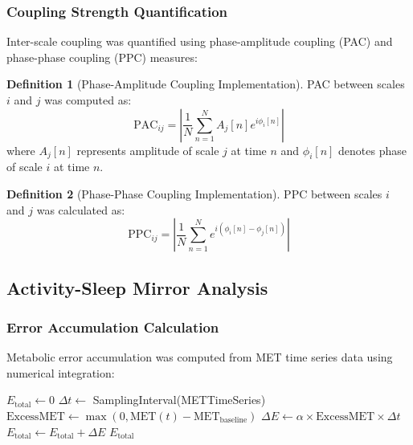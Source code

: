 \documentclass[12pt,a4paper]{article}
\theoremstyle{definition}
\newtheorem{definition}{Definition}[section]
\begin{document}
\subsubsection{Coupling Strength Quantification}

Inter-scale coupling was quantified using phase-amplitude coupling (PAC) and phase-phase coupling (PPC) measures:

\begin{definition}[Phase-Amplitude Coupling Implementation]
PAC between scales $i$ and $j$ was computed as:
\begin{equation}
\text{PAC}_{ij} = \left| \frac{1}{N} \sum_{n=1}^{N} A_j[n] e^{i\phi_i[n]} \right|
\end{equation}
where $A_j[n]$ represents amplitude of scale $j$ at time $n$ and $\phi_i[n]$ denotes phase of scale $i$ at time $n$.
\end{definition}

\begin{definition}[Phase-Phase Coupling Implementation]
PPC between scales $i$ and $j$ was calculated as:
\begin{equation}
\text{PPC}_{ij} = \left| \frac{1}{N} \sum_{n=1}^{N} e^{i(\phi_i[n] - \phi_j[n])} \right|
\end{equation}
\end{definition}

\subsection{Activity-Sleep Mirror Analysis}

\subsubsection{Error Accumulation Calculation}

Metabolic error accumulation was computed from MET time series data using numerical integration:

\begin{algorithm}
\caption{Error Accumulation Computation}
\begin{algorithmic}
    \State $E_{\text{total}} \leftarrow 0$
    \State $\Delta t \leftarrow$ SamplingInterval(METTimeSeries)
        \State $\text{ExcessMET} \leftarrow \max(0, \text{MET}(t) - \text{MET}_{\text{baseline}})$
        \State $\Delta E \leftarrow \alpha \times \text{ExcessMET} \times \Delta t$
        \State $E_{\text{total}} \leftarrow E_{\text{total}} + \Delta E$
    \EndFor
    \State \Return $E_{\text{total}}$
\EndProcedure
\end{algorithmic}
\end{algorithm}
\end{document}
